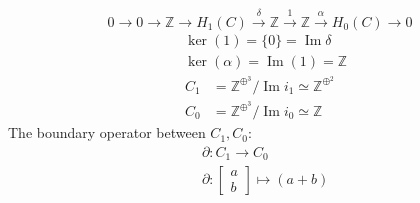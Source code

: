 \documentclass[11pt,a4paper]{report}
\DeclareMathOperator{\Ima}{Im}
\begin{document}
\begin{Ex}
                \[ 
                0 \rightarrow 0 \rightarrow \mathbb{Z} \rightarrow H_1(C) \xrightarrow{\delta} \mathbb{Z} \xrightarrow{1} \mathbb{Z} \xrightarrow{\alpha} H_0(C) \rightarrow 0 
                \]
                \begin{align*}
                  &\ker(1) = \{0\} = \Ima \delta\\
                  &\ker(\alpha) = \Ima(1) = \mathbb{Z}
                \end{align*}
                \begin{align*}
                  C_1 &= \mathbb{Z}^{\oplus^{3}} / \Ima i_1 \simeq \mathbb{Z}^{\oplus^{2}}\\
                  C_0 &= \mathbb{Z}^{\oplus^{3}} / \Ima i_0 \simeq \mathbb{Z}
                \end{align*}
                The boundary operator between $C_1, C_0$:
                  \begin{align*}
                 &\partial: C_1 \rightarrow C_0 \\
                 &\partial: \begin{bmatrix}
                    a\\b
                  \end{bmatrix}
                  \mapsto (a+b)
                \end{align*}
            

\end{Ex}
\end{document}
